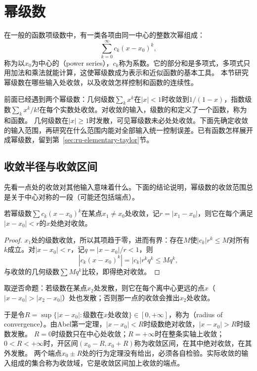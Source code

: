 \section{幂级数}
\label{sec:ru-power-series}

在一般的函数项级数中，有一类各项由同一中心的整数次幂组成：
\[
 \sum_{k=0}^\infty c_k(x-x_0)^k,
\]
称为以$x_0$为中心的（power series），$c_k$称为系数。它的部分和是多项式，多项式只用加法和乘法就能计算，这使幂级数成为表示和近似函数的基本工具。
本节研究幂级数在哪些输入处收敛，以及收敛怎样控制和函数的连续性。

前面已经遇到两个幂级数：几何级数$\sum_kx^k$在$|x|<1$时收敛到$1/(1-x)$，指数级数$\sum_kx^k/k!$在每个实数处收敛。对收敛的输入，级数的和定义了一个函数，称为和函数。
几何级数在$|x|\geq1$时发散，可见幂级数未必处处收敛。下面先确定收敛的输入范围，再研究在什么范围内能对全部输入统一控制误差。已有函数怎样展开成幂级数，留到第~\ref{sec:ru-elementary-taylor}节。

\subsection{收敛半径与收敛区间}
\label{sec:ru-radius-of-convergence}

先看一点处的收敛对其他输入意味着什么。下面的结论说明，幂级数的收敛范围总是关于中心对称的一段（可能还包括端点）。
\begin{theorem}[Abel第一定理]
\label{thm:ru-abel-lemma}
若幂级数$\sum c_k(x-x_0)^k$在某点$x_1\neq x_0$处收敛，记$r=|x_1-x_0|$，则它在每个满足$|x-x_0|<r$的$x$处绝对收敛。
\end{theorem}
\begin{proof}
$x_1$处的级数收敛，所以其项趋于零，进而有界：存在$M$使$|c_k|r^k\leq M$对所有$k$成立。对$|x-x_0|<r$，记$q=|x-x_0|/r<1$，则
\[
 |c_k(x-x_0)^k|=|c_k|r^kq^k\leq Mq^k,
\]
与收敛的几何级数$\sum Mq^k$比较，即得绝对收敛。
\end{proof}
取逆否命题：若级数在某点$x_2$处发散，则它在每个离中心更远的点$x$（$|x-x_0|>|x_2-x_0|$）处也发散；否则那一点的收敛会推出$x_2$处收敛。

于是令$R=\sup\{|x-x_0|:\text{级数在}x\text{处收敛}\}\in[0,+\infty]$，称为（radius of convergence）。由Abel第一定理，$|x-x_0|<R$时级数绝对收敛，$|x-x_0|>R$时级数发散。
$R=0$时级数只在中心处收敛；$R=+\infty$时在整条实轴上收敛；$0<R<+\infty$时，开区间$(x_0-R,x_0+R)$称为收敛区间，在其中绝对收敛，在其外发散。
两个端点$x_0\pm R$处的行为定理没有给出，必须各自检验。实际收敛的输入组成的集合称为收敛域，它是收敛区间加上收敛的端点。

